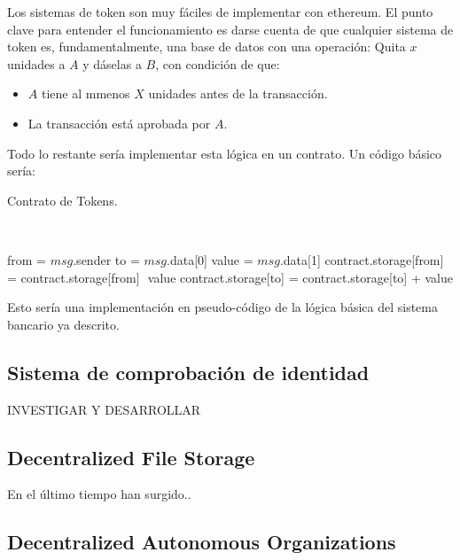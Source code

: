 \documentclass[11pt,a4paper]{article}
\begin{document}
Los sistemas de token son muy fáciles de implementar con ethereum. El punto clave para entender el funcionamiento es darse cuenta de que cualquier sistema de token es, fundamentalmente, una base de datos con una operación: Quita $x$ unidades a $A$ y dáselas a $B$, con condición de que:
\begin{itemize}
	\item $A$ tiene al mmenos $X$ unidades antes de la transacción.
	\item La transacción está aprobada por $A$. 
\end{itemize}

Todo lo restante sería implementar esta lógica en un contrato. Un código básico sería:\\

    
\begin{algorithm}
  \caption{Contrato de Tokens.}\label{token}
  \begin{algorithmic}[1]
    			\\ 
    
    \State from = $msg$.sender
	\State to = $msg$.data[0]
	\State value = $msg$.data[1]
		\State contract.storage[from] = contract.storage[from] ­ value
		\State contract.storage[to] = contract.storage[to] + value
    \EndIf
    \EndProcedure
  \end{algorithmic}
\end{algorithm}

Esto sería una implementación en pseudo-código de la lógica básica del sistema bancario ya descrito.


\subsection{Sistema de comprobación de identidad}

INVESTIGAR Y DESARROLLAR

\subsection{Decentralized File Storage}

En el último tiempo han surgido..


\subsection{Decentralized Autonomous Organizations}
\label{sec:dao}
\end{document}
